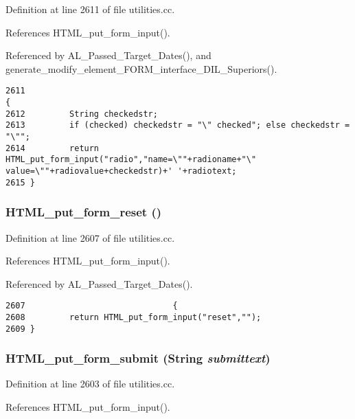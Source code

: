 Definition at line 2611 of file utilities.cc.

References HTML\_\-put\_\-form\_\-input().

Referenced by AL\_\-Passed\_\-Target\_\-Dates(), and generate\_\-modify\_\-element\_\-FORM\_\-interface\_\-DIL\_\-Superiors().



\footnotesize\begin{verbatim}2611                                                                                                         {
2612         String checkedstr;
2613         if (checked) checkedstr = "\" checked"; else checkedstr = "\"";
2614         return HTML_put_form_input("radio","name=\""+radioname+"\" value=\""+radiovalue+checkedstr)+' '+radiotext;
2615 }
\end{verbatim}\normalsize 
{}
\subsubsection{ HTML\_\-put\_\-form\_\-reset ()}\label{dil2al_8hh_a272}




Definition at line 2607 of file utilities.cc.

References HTML\_\-put\_\-form\_\-input().

Referenced by AL\_\-Passed\_\-Target\_\-Dates().



\footnotesize\begin{verbatim}2607                              {
2608         return HTML_put_form_input("reset","");
2609 }
\end{verbatim}\normalsize 
{}
\subsubsection{ HTML\_\-put\_\-form\_\-submit ({\bf String} {\em submittext})}\label{dil2al_8hh_a271}




Definition at line 2603 of file utilities.cc.

References HTML\_\-put\_\-form\_\-input().

